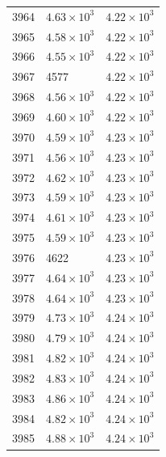 \begin{table}[H]
\begin{tabular}{lll}
3964 & $\displaystyle 4.63 \times 10^{3}$ & $\displaystyle 4.22 \times 10^{3}$ \\
3965 & $\displaystyle 4.58 \times 10^{3}$ & $\displaystyle 4.22 \times 10^{3}$ \\
3966 & $\displaystyle 4.55 \times 10^{3}$ & $\displaystyle 4.22 \times 10^{3}$ \\
3967 & 4577 & $\displaystyle 4.22 \times 10^{3}$ \\
3968 & $\displaystyle 4.56 \times 10^{3}$ & $\displaystyle 4.22 \times 10^{3}$ \\
3969 & $\displaystyle 4.60 \times 10^{3}$ & $\displaystyle 4.22 \times 10^{3}$ \\
3970 & $\displaystyle 4.59 \times 10^{3}$ & $\displaystyle 4.23 \times 10^{3}$ \\
3971 & $\displaystyle 4.56 \times 10^{3}$ & $\displaystyle 4.23 \times 10^{3}$ \\
3972 & $\displaystyle 4.62 \times 10^{3}$ & $\displaystyle 4.23 \times 10^{3}$ \\
3973 & $\displaystyle 4.59 \times 10^{3}$ & $\displaystyle 4.23 \times 10^{3}$ \\
3974 & $\displaystyle 4.61 \times 10^{3}$ & $\displaystyle 4.23 \times 10^{3}$ \\
3975 & $\displaystyle 4.59 \times 10^{3}$ & $\displaystyle 4.23 \times 10^{3}$ \\
3976 & 4622 & $\displaystyle 4.23 \times 10^{3}$ \\
3977 & $\displaystyle 4.64 \times 10^{3}$ & $\displaystyle 4.23 \times 10^{3}$ \\
3978 & $\displaystyle 4.64 \times 10^{3}$ & $\displaystyle 4.23 \times 10^{3}$ \\
3979 & $\displaystyle 4.73 \times 10^{3}$ & $\displaystyle 4.24 \times 10^{3}$ \\
3980 & $\displaystyle 4.79 \times 10^{3}$ & $\displaystyle 4.24 \times 10^{3}$ \\
3981 & $\displaystyle 4.82 \times 10^{3}$ & $\displaystyle 4.24 \times 10^{3}$ \\
3982 & $\displaystyle 4.83 \times 10^{3}$ & $\displaystyle 4.24 \times 10^{3}$ \\
3983 & $\displaystyle 4.86 \times 10^{3}$ & $\displaystyle 4.24 \times 10^{3}$ \\
3984 & $\displaystyle 4.82 \times 10^{3}$ & $\displaystyle 4.24 \times 10^{3}$ \\
3985 & $\displaystyle 4.88 \times 10^{3}$ & $\displaystyle 4.24 \times 10^{3}$ \\

\end{tabular}
\end{table}
